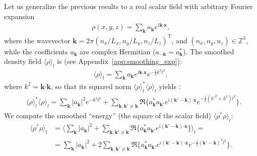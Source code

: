 \documentclass[]{article}
\newcommand{\mathcolorbox}[2]{\colorbox{#1}{$\displaystyle #2$}}
\newcommand{\bcdot}{\bm{\cdot}}
\begin{document}
Let us generalize the previous results to a real scalar field with arbitrary Fourier expansion
%
\begin{align}
	\rho (x,y,z) = \sum_{\bm k} a_{\bm k} e^{i \bm k \bcdot\bm x }  ,
\end{align}
%
where the wavevector $\bm k = 2 \pi \left(n_x/L_x, n_y/L_y, n_z/L_z \right)^\mathrm{T}$, and $\left(n_x, n_y, n_z \right) \in \mathbb{Z}^3$, while the coefficients $a_{\bm k}$ are complex Hermitian ($a_{-\bm k} = a_{\bm k}^*$). 
The smoothed density field $\langle \rho \rangle_l$ is (see Appendix~\ref{app:smoothing_exp}):
%
\begin{align}
	\langle \rho \rangle_l = \sum_{\bm k} a_{\bm k} e^{i \bm k \bcdot\bm x } e^{-\frac{1}{2} k^2 l^2}   ,
\end{align}
%
where $k^2 = \bm k \bcdot\bm k$, so that its squared norm $\langle \rho \rangle_l^* \langle \rho \rangle_l$ yields :
%
\begin{align}
	&\langle \rho \rangle_l^* \langle \rho \rangle_l  = \sum_{\bm k} |a_{\bm k}|^2 e^{- k^2 l^2} +  \sum_{\bm k, \bm k' \neq \bm k} \Re \lbrace a_{\bm k}^* a_{\bm k'} e^{i (\bm k' - \bm k) \bcdot\bm x } e^{-\frac{1}{2} (k'^2 + k^2) l^2} \rbrace.
\end{align}
%
We compute the smoothed ``energy'' (the square of the scalar field) $\langle \rho^* \rho \rangle_l$:
%
\begin{align}
	\langle \rho^* \rho \rangle_l &= \langle \sum_{\bm k} |a_{\bm k}|^2  +  \sum_{\bm k, \bm k' \neq \bm k} \Re \lbrace a_{\bm k}^* a_{\bm k'} e^{i (\bm k' - \bm k) \bcdot\bm x } \rbrace  \rangle_l = \nonumber \\
	&= \sum_{\bm k} |a_{\bm k}|^2 + 2 \sum_{\bm k, \bm k' \neq \bm k} \Re \lbrace a_{\bm k}^* a_{\bm k'} e^{i (\bm k' - \bm k) \bcdot\bm x } e^{-\frac{1}{2} (\bm k' - \bm k)^2 l^2} \rbrace.
\end{align}
%
\end{document}
